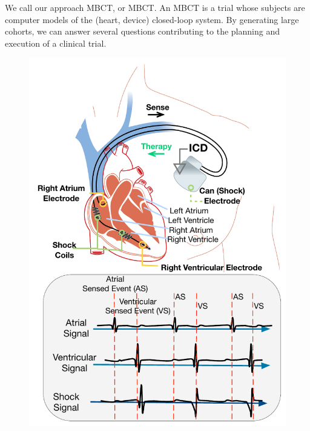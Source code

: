 We call our approach \ac{MBCT}, or \ac{MBCT}.
An \ac{MBCT} is a trial whose subjects are computer models of the (heart, device) closed-loop system.
By generating large cohorts, we can answer several questions contributing to the planning and execution of a clinical trial.



\begin{figure}[tb]
	\vspace{-10pt}
	\includegraphics[scale=0.4]{figures/figICD.pdf}
	\vspace{-10pt}
	\vspace{-10pt}
	\label{fig:icd}
\end{figure}




